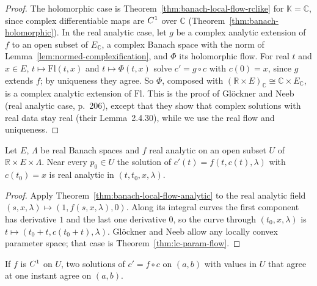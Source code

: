 \begin{proof}
  \leanok
  The holomorphic case is Theorem~\ref{thm:banach-local-flow-rclike} for $\mathbb{K} = \mathbb{C}$,
  since complex differentiable maps are $C^{1}$ over $\mathbb{C}$
  (Theorem~\ref{thm:banach-holomorphic}). In the real analytic case, let $g$ be a complex
  analytic extension of $f$ to an open subset of $E_{\mathbb{C}}$, a complex Banach space with
  the norm of Lemma~\ref{lem:normed-complexification}, and $\Phi$ its holomorphic flow. For real
  $t$ and $x \in E$, $t \mapsto \mathrm{Fl}(t, x)$ and $t \mapsto \Phi(t, x)$ solve
  $c' = g \circ c$ with $c(0) = x$, since $g$ extends $f$; by uniqueness they agree. So $\Phi$,
  composed with $(\mathbb{R} \times E)_{\mathbb{C}} \cong \mathbb{C} \times E_{\mathbb{C}}$, is
  a complex analytic extension of $\mathrm{Fl}$. This is the proof of Glöckner and Neeb (real
  analytic case, p.~206), except that they show that complex solutions with real data stay real
  (their Lemma~2.4.30), while we use the real flow and uniqueness.
\end{proof}

\begin{corollary}
  \label{cor:banach-flow-analytic-param}
  \leanok
  Let $E$, $\Lambda$ be real Banach spaces and $f$ real analytic on an open subset $U$ of
  $\mathbb{R} \times E \times \Lambda$. Near every $p_0 \in U$ the solution of
  $c'(t) = f(t, c(t), \lambda)$ with $c(t_0) = x$ is real analytic in $(t, t_0, x, \lambda)$.
\end{corollary}

\begin{proof}
  \leanok
  Apply Theorem~\ref{thm:banach-local-flow-analytic} to the real analytic field
  $(s, x, \lambda) \mapsto (1, f(s, x, \lambda), 0)$. Along its integral curves the first
  component has derivative $1$ and the last one derivative $0$, so the curve through
  $(t_0, x, \lambda)$ is $t \mapsto (t_0 + t, c(t_0 + t), \lambda)$. Glöckner and Neeb allow any
  locally convex parameter space; that case is Theorem~\ref{thm:lc-param-flow}.
\end{proof}

\begin{theorem}[Uniqueness]
  \label{thm:banach-ode-uniqueness}
  \leanok
  If $f$ is $C^{1}$ on $U$, two solutions of $c' = f \circ c$ on $(a, b)$ with values in $U$
  that agree at one instant agree on $(a, b)$.
\end{theorem}

